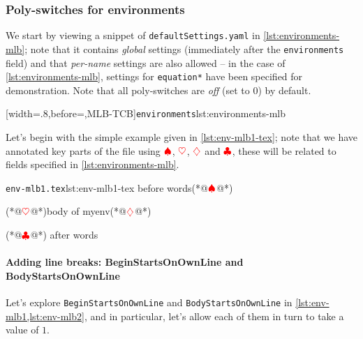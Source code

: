 \subsubsection{Poly-switches for environments}\label{sec:modifylinebreaks-environments}
	We start by viewing a snippet of \texttt{defaultSettings.yaml} in
	\cref{lst:environments-mlb}; note that it contains \emph{global} settings (immediately
	after the \texttt{environments} field) and that \emph{per-name} settings are also allowed
	-- in the case of \cref{lst:environments-mlb}, settings for \texttt{equation*} have been
	specified for demonstration. Note that all poly-switches are \emph{off} (set to 0) by
	default.

	[width=.8\linewidth,before=\centering,MLB-TCB]{\texttt{environments}}{lst:environments-mlb}

	Let's begin with the simple example given in \cref{lst:env-mlb1-tex}; note that we have
	annotated key parts of the file using $\color{red}\spadesuit$, $\color{red}\heartsuit$,
	$\color{red}\diamondsuit$ and $\color{red}\clubsuit$, these will be related to fields
	specified in \cref{lst:environments-mlb}.

	\begin{cmhlistings}[style=tcblatex,escapeinside={(*@}{@*)}]{\texttt{env-mlb1.tex}}{lst:env-mlb1-tex}
before words(*@$\color{red}\spadesuit$@*) \begin{myenv}(*@$\color{red}\heartsuit$@*)body of myenv(*@$\color{red}\diamondsuit$@*)\end{myenv}(*@$\color{red}\clubsuit$@*) after words
\end{cmhlistings}

	\paragraph{Adding line breaks: BeginStartsOnOwnLine and BodyStartsOnOwnLine}
		Let's explore \texttt{BeginStartsOnOwnLine} and \texttt{BodyStartsOnOwnLine} in
		\cref{lst:env-mlb1,lst:env-mlb2}, and in particular, let's allow each of them in turn to
		take a value of $1$.

